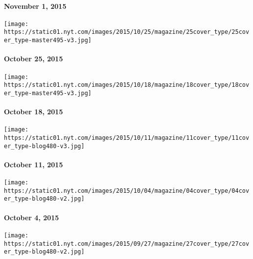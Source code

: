 \hypertarget{november-1-2015}{%
\paragraph{November 1, 2015}\label{november-1-2015}}

\href{http://www.nytimes.com/indexes/2015/10/25/magazine/index.html}{}

\texttt{[image: https://static01.nyt.com/images/2015/10/25/magazine/25cover\_type/25cover\_type-master495-v3.jpg]}

\hypertarget{october-25-2015}{%
\paragraph{October 25, 2015}\label{october-25-2015}}

\href{http://www.nytimes.com/indexes/2015/10/18/magazine/index.html}{}

\texttt{[image: https://static01.nyt.com/images/2015/10/18/magazine/18cover\_type/18cover\_type-master495-v3.jpg]}

\hypertarget{october-18-2015}{%
\paragraph{October 18, 2015}\label{october-18-2015}}

\href{http://www.nytimes.com/indexes/2015/10/11/magazine/index.html}{}

\texttt{[image: https://static01.nyt.com/images/2015/10/11/magazine/11cover\_type/11cover\_type-blog480-v3.jpg]}

\hypertarget{october-11-2015}{%
\paragraph{October 11, 2015}\label{october-11-2015}}

\href{http://www.nytimes.com/indexes/2015/10/04/magazine/index.html}{}

\texttt{[image: https://static01.nyt.com/images/2015/10/04/magazine/04cover\_type/04cover\_type-blog480-v2.jpg]}

\hypertarget{october-4-2015}{%
\paragraph{October 4, 2015}\label{october-4-2015}}

\href{http://www.nytimes.com/indexes/2015/09/27/magazine/index.html}{}

\texttt{[image: https://static01.nyt.com/images/2015/09/27/magazine/27cover\_type/27cover\_type-blog480-v2.jpg]}

